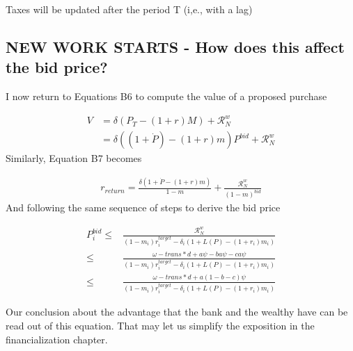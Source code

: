 Taxes will be updated after the period T (i,e., with a lag)

\subsection{NEW WORK STARTS - How does this affect the bid price?}

I now return to Equations B6 to compute the value of a proposed purchase


\begin{align*}
V &= \delta \left(P_T - (1+r)M\right) +      \mathcal{R}^w_N  \tag{B6} \\
  &= \delta \left((1+\dot P)    - (1+r)m    \right) P^{bid} + \mathcal{R}^w_N%
\end{align*}
Similarly, Equation B7 becomes

\begin{align*}
r_{return} = \frac{\delta \left(1 + \dot P - (1+r)m\right)}{1-m} + \frac{\mathcal{R}^w_N}{(1-m)^{bid}}\tag{B7}
\end{align*}
And following the same sequence of steps to derive the bid price 

\begin{align*}
P_i^{bid} \le &   \frac{\mathcal{R}^w_N}{(1-m_i)r_i^{target} - \delta_i \left(1 + L(P) - (1+r_i)m_i \right)} \tag{B10}\\
		 \le &   \frac{ \omega - trans*d + a\psi -   ba\psi - ca\psi}{(1-m_i)r_i^{target} - \delta_i \left(1 + L(P) - (1+r_i)m_i \right)}	\\	
   		 \le &   \frac{ \omega - trans*d + a(1-b-c)\psi}{(1-m_i)r_i^{target} - \delta_i \left(1 + L(P) - (1+r_i)m_i \right)}	
\end{align*}

Our conclusion about the advantage that the bank and the wealthy have can be read out of this equation. 
That may let us simplify the exposition in the financialization chapter.







